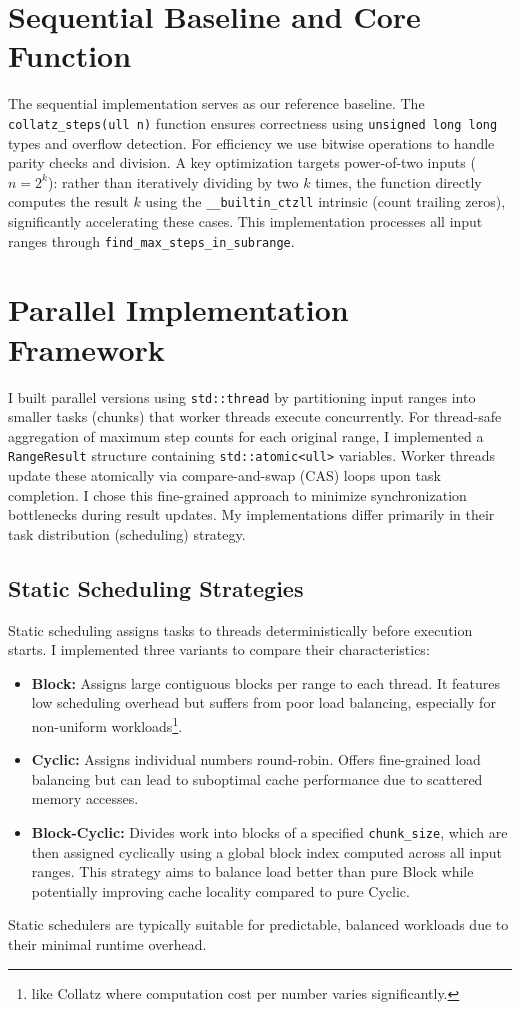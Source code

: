 \documentclass[10pt]{article}
\newcommand{\code}[1]{\texttt{#1}} %
\begin{document}
\section{Sequential Baseline and Core Function} %
The sequential implementation serves as our reference baseline. The \code{collatz\_steps(ull n)} function ensures correctness using \code{unsigned long long} types and overflow detection. For efficiency we use bitwise operations to handle parity checks and division. A key optimization targets power-of-two inputs ($n=2^k$): rather than iteratively dividing by two $k$ times, the function directly computes the result $k$ using the \code{\_\_builtin\_ctzll} intrinsic (count trailing zeros), significantly accelerating these cases. This implementation processes all input ranges through \code{find\_max\_steps\_in\_subrange}.

\section{Parallel Implementation Framework}
I built parallel versions using \code{std::thread} by partitioning input ranges into smaller tasks (chunks) that worker threads execute concurrently. For thread-safe aggregation of maximum step counts for each original range, I implemented a \code{RangeResult} structure containing \code{std::atomic<ull>} variables. Worker threads update these atomically via compare-and-swap (CAS) loops upon task completion. I chose this fine-grained approach to minimize synchronization bottlenecks during result updates. My implementations differ primarily in their task distribution (scheduling) strategy.

\subsection{Static Scheduling Strategies}
Static scheduling assigns tasks to threads deterministically before execution starts. I implemented three variants to compare their characteristics:
\begin{itemize}
    \item \textbf{Block:} Assigns large contiguous blocks per range to each thread. It features low scheduling overhead but suffers from poor load balancing, especially for non-uniform workloads\footnote{like Collatz where computation cost per number varies significantly.}.
    \item \textbf{Cyclic:} Assigns individual numbers round-robin. Offers fine-grained load balancing but can lead to suboptimal cache performance due to scattered memory accesses.
    \item \textbf{Block-Cyclic:} Divides work into blocks of a specified \code{chunk\_size}, which are then assigned cyclically using a global block index computed across all input ranges. This strategy aims to balance load better than pure Block while potentially improving cache locality compared to pure Cyclic.
\end{itemize}
Static schedulers are typically suitable for predictable, balanced workloads due to their minimal runtime overhead.
\end{document}
